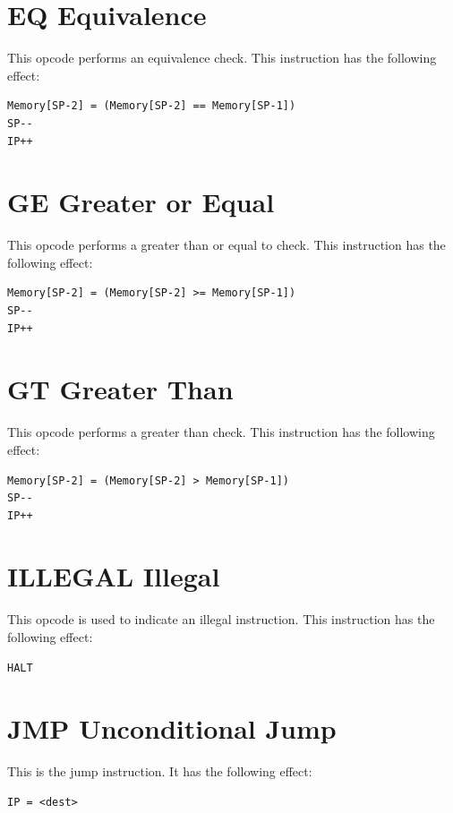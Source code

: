 \documentclass[11pt,a4paper,oneside]{book}
\begin{document}
\pagebreak
\section[EQ]{\texorpdfstring{EQ \hfill Equivalence}{EQ -- Equivalence}}
This opcode performs an equivalence check. This instruction has the following effect:
\begin{verbatim}
Memory[SP-2] = (Memory[SP-2] == Memory[SP-1])
SP--
IP++
\end{verbatim}

\pagebreak
\section[GE]{\texorpdfstring{GE \hfill Greater or Equal}{GE -- Greater or Equal}}
This opcode performs a greater than or equal to check. This instruction has the following effect:
\begin{verbatim}
Memory[SP-2] = (Memory[SP-2] >= Memory[SP-1])
SP--
IP++
\end{verbatim}

\pagebreak
\section[GT]{\texorpdfstring{GT \hfill Greater Than}{GT -- Greater Than}}
This opcode performs a greater than check. This instruction has the following effect:
\begin{verbatim}
Memory[SP-2] = (Memory[SP-2] > Memory[SP-1])
SP--
IP++
\end{verbatim}

\pagebreak
\section[ILLEGAL]{\texorpdfstring{ILLEGAL \hfill Illegal}{ILLEGAL -- Illegal}}
This opcode is used to indicate an illegal instruction. This instruction has the following effect:
\begin{verbatim}
HALT
\end{verbatim}

\pagebreak
\section[JMP]{\texorpdfstring{JMP \hfill Unconditional Jump}{JMP -- Unconditional Jump}}
This is the jump instruction. It has the following effect:
\begin{verbatim}
IP = <dest>
\end{verbatim}
\end{document}

